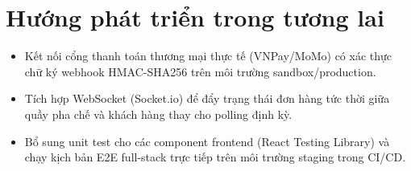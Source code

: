 \documentclass[12pt,a4paper]{report}
\begin{document}
\section{Hướng phát triển trong tương lai}
\begin{itemize}[leftmargin=*]
\item Kết nối cổng thanh toán thương mại thực tế (VNPay/MoMo) có xác thực chữ ký webhook HMAC-SHA256 trên môi trường sandbox/production.
\item Tích hợp WebSocket (Socket.io) để đẩy trạng thái đơn hàng tức thời giữa quầy pha chế và khách hàng thay cho polling định kỳ.
\item Bổ sung unit test cho các component frontend (React Testing Library) và chạy kịch bản E2E full-stack trực tiếp trên môi trường staging trong CI/CD.
\end{itemize}
\end{document}

